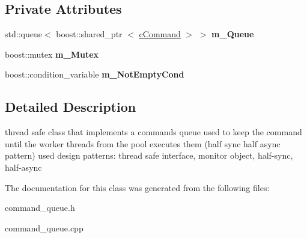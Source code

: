 \subsection*{\-Private \-Attributes}
\begin{DoxyCompactItemize}
\item 
\hypertarget{classengine_1_1cCommandQueue_a505e669143dc3a07ad178f689fa61e0c}{std\-::queue$<$ boost\-::shared\-\_\-ptr\*
$<$ \hyperlink{classengine_1_1cCommand}{c\-Command} $>$ $>$ {\bfseries m\-\_\-\-Queue}}\label{classengine_1_1cCommandQueue_a505e669143dc3a07ad178f689fa61e0c}

\item 
\hypertarget{classengine_1_1cCommandQueue_a3382d012fe90188199630bef438d7901}{boost\-::mutex {\bfseries m\-\_\-\-Mutex}}\label{classengine_1_1cCommandQueue_a3382d012fe90188199630bef438d7901}

\item 
\hypertarget{classengine_1_1cCommandQueue_a7edc3ed909364aca4956ff6b8d95b912}{boost\-::condition\-\_\-variable {\bfseries m\-\_\-\-Not\-Empty\-Cond}}\label{classengine_1_1cCommandQueue_a7edc3ed909364aca4956ff6b8d95b912}

\end{DoxyCompactItemize}


\subsection{\-Detailed \-Description}
thread safe class that implements a commands queue used to keep the command until the worker threads from the pool executes them (half sync half async pattern) used design patterns\-: thread safe interface, monitor object, half-\/sync, half-\/async 

\-The documentation for this class was generated from the following files\-:\begin{DoxyCompactItemize}
\item 
command\-\_\-queue.\-h\item 
command\-\_\-queue.\-cpp\end{DoxyCompactItemize}
